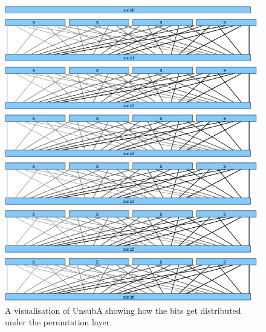 \documentclass[12pt,a4paper]{article}
\begin{document}
\begin{figure}[P]
\includegraphics[width=\textwidth]{diagrams/bit}
\caption[Visualisation of UnsubA Permutation emphasising Bit Location]{A visualisation of UnsubA showing how the bits get distributed under
the permutation layer.}
\label{fig:bit}
\end{figure}
\end{document}
